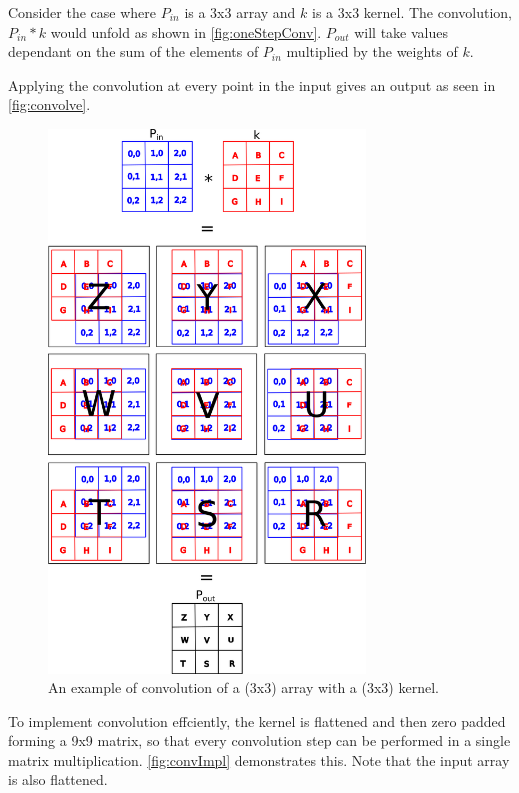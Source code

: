 Consider the case where $P_{in}$ is a 3x3 array and $k$ is a 3x3 kernel. The convolution, $P_{in} * k$ would unfold as shown in \autoref{fig:oneStepConv}. $P_{out}$ will take values dependant on the sum of the elements of $P_{in}$ multiplied by the weights of $k$.

Applying the convolution at every point in the input gives an output as seen in \autoref{fig:convolve}.


\begin{figure}
	\centering	\includegraphics[width=0.75\textwidth]{Figs/intro2dl/convolution.png}
	\caption{An example of convolution of a (3x3) array with a (3x3) kernel.}
	\label{fig:convolve}
\end{figure}


To implement convolution effciently, the kernel is flattened and then zero padded forming a 9x9 matrix, so that every convolution step can be performed in a single matrix multiplication. \autoref{fig:convImpl} demonstrates this. Note that the input array is also flattened. 

